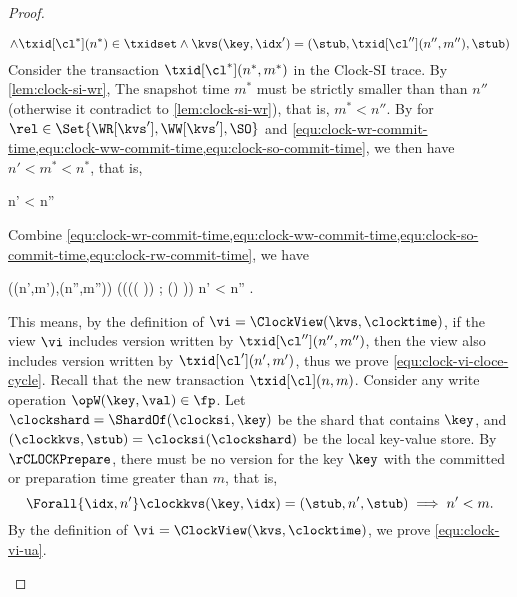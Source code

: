 \begin{proof}
\begin{enumerate}
\begin{enumerate}
\begin{enumerate}
\[                \land \txid[\cl^*](n^*) \in \txidset 
                \land \kvs(\key,\idx') = (\stub, \txid[\cl''](n'',m''), \stub)
            \]
            Consider the transaction \( \txid[\cl^*](n^*,m^*) \) in the Clock-SI trace.
            By \cref{lem:clock-si-wr},
            The snapshot time \( m^* \)  must be strictly smaller than than \( n'' \) (otherwise it contradict to \cref{lem:clock-si-wr}),
            that is, \(m^{*} < n'' \).
            By  for \( \rel \in \Set{\WR[\kvs'],\WW[\kvs'],\SO} \)
            and \cref{equ:clock-wr-commit-time,equ:clock-ww-commit-time,equ:clock-so-commit-time},
            we then have \(  n' < m^* < n^* \), that is,
            \begin{Formulae}
            \begin{Formula}
                \implies n' < n''
                \label{equ:clock-rw-commit-time}
            \end{Formula}
            \end{Formulae}
        \end{enumerate}
        Combine \cref{equ:clock-wr-commit-time,equ:clock-ww-commit-time,equ:clock-so-commit-time,equ:clock-rw-commit-time},
        we have
            \begin{Formulae}
            \begin{Formula}
                (\txid[\cl'](n',m'),\txid[\cl''](n'',m'')) \in 
                    \TraRe(\left({\Trasi(( \WR[\kvs] \cup \SO \cup \WW[\kvs]))} ; (\RWRelf[\kvs']) \right))
                \implies n' < n'' .
                \label{equ:clock-si-commit-time}
            \end{Formula}
            \end{Formulae}
        This means, by the definition of \( \vi = \ClockView(\kvs,\clocktime) \),
        if the view \( \vi \) includes version written by  \( \txid[\cl''](n'',m'') \),
        then the view also includes version written by \( \txid[\cl'](n',m') \),
        thus we prove \cref{equ:clock-vi-cloce-cycle}.
        Recall that the new transaction \( \txid[\cl](n,m) \).
        Consider any write operation \( \opW(\key,\val) \in \fp \).
        Let \( \clockshard = \ShardOf(\clocksi,\key) \) be the shard that contains \( \key \),
        and \( (\clockkvs,\stub) = \clocksi(\clockshard) \) be the local key-value store.
        By \( \rCLOCKPrepare \), 
        there must be no version for the key \( \key \) 
        with the committed or preparation time greater than \( m \),
        that is,
        \[
            \Forall{\idx,n'} \clockkvs(\key,\idx) = (\stub,n',\stub) \implies n' < m .
        \] 
        By the definition of \( \vi = \ClockView(\kvs,\clocktime) \),
        we prove \cref{equ:clock-vi-ua}. \qedhere
    \end{enumerate}
\end{enumerate}
\end{proof}
